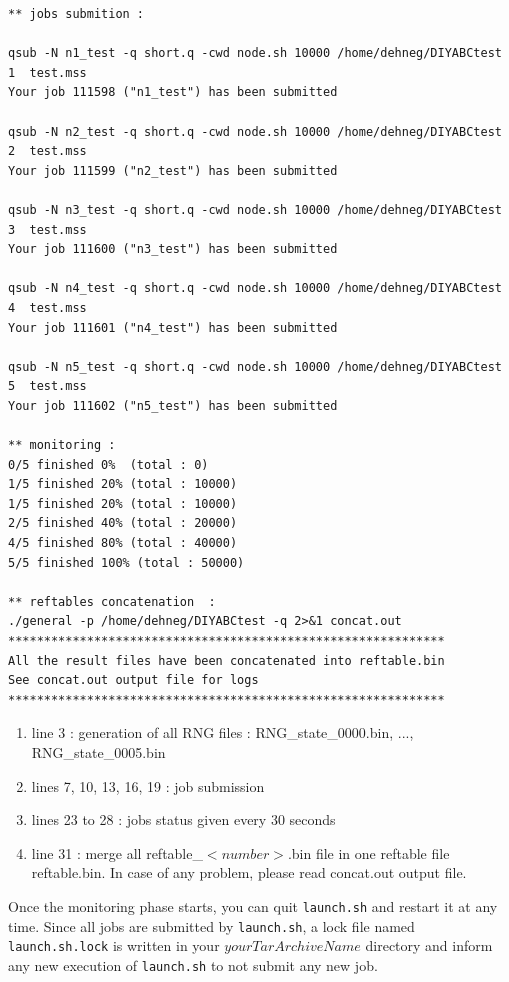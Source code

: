 \begin{minipage}{0.99\textwidth}
\begin{lstlisting}
** jobs submition :

qsub -N n1_test -q short.q -cwd node.sh 10000 /home/dehneg/DIYABCtest 1  test.mss
Your job 111598 ("n1_test") has been submitted

qsub -N n2_test -q short.q -cwd node.sh 10000 /home/dehneg/DIYABCtest 2  test.mss
Your job 111599 ("n2_test") has been submitted

qsub -N n3_test -q short.q -cwd node.sh 10000 /home/dehneg/DIYABCtest 3  test.mss
Your job 111600 ("n3_test") has been submitted

qsub -N n4_test -q short.q -cwd node.sh 10000 /home/dehneg/DIYABCtest 4  test.mss
Your job 111601 ("n4_test") has been submitted

qsub -N n5_test -q short.q -cwd node.sh 10000 /home/dehneg/DIYABCtest 5  test.mss
Your job 111602 ("n5_test") has been submitted

** monitoring :
0/5 finished 0%  (total : 0)
1/5 finished 20% (total : 10000)
1/5 finished 20% (total : 10000)
2/5 finished 40% (total : 20000)
4/5 finished 80% (total : 40000)
5/5 finished 100% (total : 50000)

** reftables concatenation  :
./general -p /home/dehneg/DIYABCtest -q 2>&1 concat.out
*************************************************************
All the result files have been concatenated into reftable.bin
See concat.out output file for logs
*************************************************************
\end{lstlisting}
   \end{minipage}
\begin{enumerate}
    \item line 3 : generation of all RNG files : \textsf{RNG\_state\_0000.bin}, ..., \textsf{RNG\_state\_0005.bin}
    \item lines 7, 10, 13, 16, 19 : job submission 
    \item lines 23 to 28 : jobs status given every 30 seconds
    \item line 31 : merge all \textsf{reftable\_$<number>$.bin} file in one reftable file \textsf{reftable.bin}. In case of any problem, please read \textsf{concat.out} output file.
\end{enumerate}
Once the monitoring phase starts, you can quit \texttt{launch.sh} and restart it at any time. Since all jobs are submitted by \texttt{launch.sh}, a lock file named \texttt{launch.sh.lock} is written in your $yourTarArchiveName$ directory and inform any new execution of \texttt{launch.sh} to not submit any new job.

